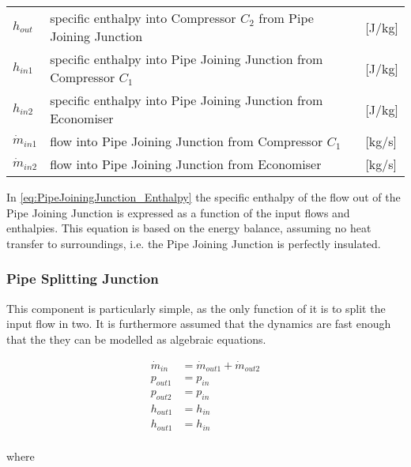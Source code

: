 \begin{center}
	\begin{tabular}{l p{10cm} l}
		$h_{out}$ 	& specific enthalpy into Compressor $ C_2 $ from Pipe Joining Junction 		& [\si{J}/\si{kg}]\\ 
		$h_{in1}$ 	& specific enthalpy into Pipe Joining Junction from Compressor $ C_1 $  		& [\si{J}/\si{kg}]\\ 
		$h_{in2}$ 	& specific enthalpy into Pipe Joining Junction from Economiser   			& [\si{J}/\si{kg}]\\ 
		$\dot{m}_{in1}$ & flow into Pipe Joining Junction from Compressor $ C_1 $ 		& [\si{kg}/\si{s}]\\
		$\dot{m}_{in2}$ & flow into Pipe Joining Junction from Economiser 				& [\si{kg}/\si{s}]\\
	\end{tabular}
\end{center}
In \cref{eq:PipeJoiningJunction_Enthalpy} the specific enthalpy of the flow out of the Pipe Joining Junction is expressed as a function of the input flows and enthalpies. This equation is based on the energy balance, assuming no heat transfer to surroundings, i.e. the Pipe Joining Junction is perfectly insulated.

\subsubsection{Pipe Splitting Junction}

This component is particularly simple, as the only function of it is to split the input flow in two. It is furthermore assumed that the dynamics are fast enough that the they can be modelled as algebraic equations.

\begin{equation} \label{eq:PipeSplittingJunction_Enthalpy}
	\begin{split}
		\dot{m}_{in} &= \dot{m}_{out1} + \dot{m}_{out2} \\
		p_{out1} &= p_{in} \\
		p_{out2} &= p_{in} \\
		h_{out1} &= h_{in} \\
		h_{out1} &= h_{in} \\
	\end{split}
\end{equation}

where

